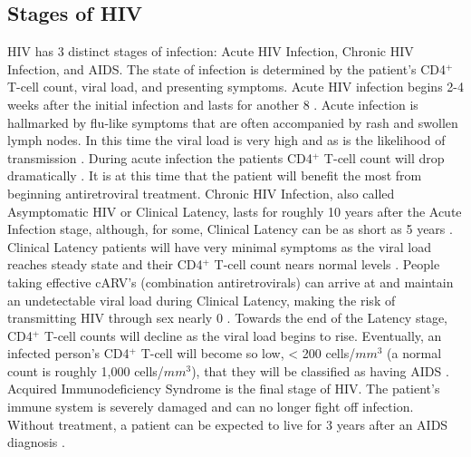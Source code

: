 \documentclass[letterpaper, 11 pt, conference]{ieeeconf}
\begin{document}
\subsection{Stages of HIV}
HIV has 3 distinct stages of infection: Acute HIV Infection, Chronic HIV Infection, and AIDS. The state of infection is determined by the patient's CD4$^{+}$ T-cell count, viral load, and presenting symptoms. Acute HIV infection begins 2-4 weeks after the initial infection and lasts for another 8 \cite{HIVinfo, Modeling3Stages}. Acute infection is hallmarked by flu-like symptoms that are often accompanied by rash and swollen lymph nodes. In this time the viral load is very high and as is the likelihood of transmission \cite{HIVinfo}. During acute infection the patients CD4$^{+}$ T-cell count will drop dramatically \cite{Modeling3Stages}. It is at this time that the patient will benefit the most from beginning antiretroviral treatment. Chronic HIV Infection, also called Asymptomatic HIV or Clinical Latency, lasts for roughly 10 years after the Acute Infection stage, although, for some,  Clinical Latency can be as short as 5 years \cite{HIVinfo}. Clinical Latency patients will have very minimal symptoms as the viral load reaches steady state and their CD4$^{+}$ T-cell count nears normal levels \cite{HIVinfo, Modeling3Stages}. People taking effective cARV's (combination antiretrovirals) can arrive at and maintain an undetectable viral load during Clinical Latency, making the risk of transmitting HIV through sex nearly 0 \cite{HIVinfo}. Towards the end of the Latency stage, CD4$^{+}$ T-cell counts will decline as the viral load begins to rise. Eventually, an infected person's CD4$^{+}$ T-cell will become so low, < 200 cells/$mm^{3}$ (a normal count is roughly 1,000 cells/$mm^{3}$), that they will be classified as having AIDS \cite{Modeling3Stages}. Acquired Immunodeficiency Syndrome is the final stage of HIV. The patient's immune system is severely damaged and can no longer fight off infection. Without treatment, a patient can be expected to live for 3 years after an AIDS diagnosis \cite{HIVinfo}. 
\end{document}
